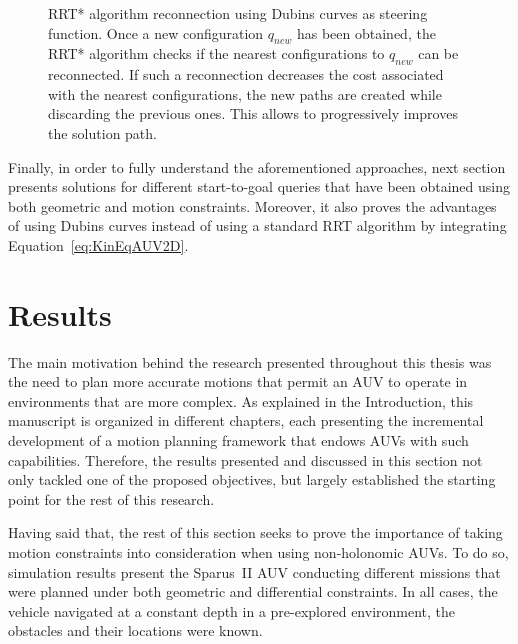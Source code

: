 \begin{figure}[htbp]
    \myfloatalign
     \quad
     \quad
\caption[RRT* algorithm reconnection using Dubins curves as steering function.]
{\ac{RRT*} algorithm reconnection using Dubins curves as steering function.
\protect {} Once a new configuration
$q_{new}$ has been obtained, 
\protect {} the \ac{RRT*} algorithm checks
if the nearest configurations to $q_{new}$ can be reconnected.
\protect {} If such a reconnection
decreases the cost associated with the nearest configurations, the new paths are
created while discarding the previous ones. This allows to progressively
improves the solution path.}
\label{fig:ReconnectionRRTstarDubins}
\end{figure}

Finally, in order to fully understand the aforementioned approaches, next
section presents solutions for different start-to-goal queries that have been
obtained using both geometric and motion constraints. Moreover, it also proves
the advantages of using Dubins curves instead of using a standard \ac{RRT}
algorithm by integrating Equation~\eqref{eq:KinEqAUV2D}.

\section{Results}

The main motivation behind the research presented throughout this thesis was the
need to plan more accurate motions that permit an \ac{AUV} to operate in
environments that are more complex. As explained in the Introduction, this
manuscript is organized in different chapters, each presenting the incremental
development of a motion planning framework that endows \acp{AUV} with such
capabilities. Therefore, the results presented and discussed in this section not
only tackled one of the proposed objectives, but largely established the
starting point for the rest of this research.

Having said that, the rest of this section seeks to prove the importance of
taking motion constraints into consideration when using non-holonomic \acp{AUV}.
To do so, simulation results present the Sparus~II \ac{AUV} conducting different
missions that were planned under both geometric and differential constraints. In
all cases, the vehicle navigated at a constant depth in a pre-explored
environment, \ie the obstacles and their locations were known.

